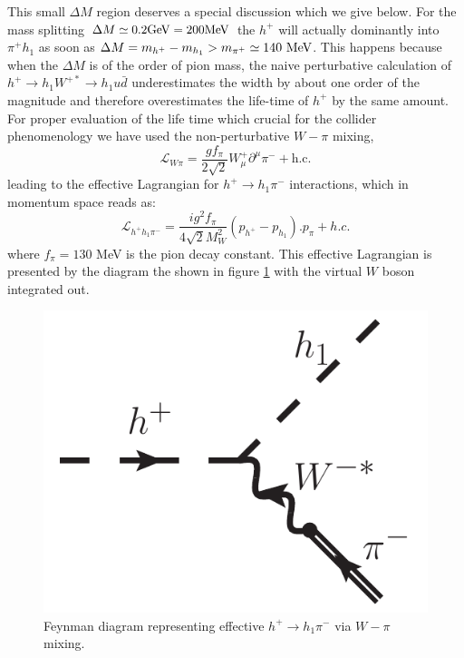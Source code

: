 \documentclass[12pt,a4paper]{article}
\newcommand {\blue} {\color{blue}}
\begin{document}
{\blue This small $\Delta M$ region deserves a special discussion which we give below.
For the mass splitting $\Delta M\simeq 0.2  {\rm GeV} = 200 {\rm MeV}$ the $h^+$ will actually  dominantly into $\pi^+ h_1$
as soon as $\Delta M = m_{h^+}-m_{h_1} > m_{\pi^+} \simeq 140~{\rm MeV}$. This happens because when the $\Delta M$ is of the order of pion mass, the naive perturbative calculation of $h^+ \to h_1 W^{+*} \to  h_1 u\bar{d}$ underestimates the 
width by about one order of the magnitude and therefore overestimates
 the life-time of $h^+$ by the same amount. 
For proper evaluation of the life time which crucial for the collider phenomenology we have used the non-perturbative 
$W-\pi$ mixing, 
\begin{equation}
  \mathcal{L}_{W\pi}  = \frac{g f_{\pi}}{2\sqrt{2}}W_{\mu}^{+}\partial^{\mu}\pi^{-} + 
\mathrm{h.c.}
\label{eq:wpi}
  \end{equation}
leading to the effective Lagrangian for $h^+ \to  h_1 \pi^-$ interactions,
which in momentum space reads as:
  \begin{equation}
\mathcal{L}_{h^+h_1\pi^-}  =  
\frac{i g^2 f_{\pi}}{4\sqrt{2}M_W^2} 
(p_{h^+}-p_{h_1}).p_{\pi} +h.c.
\label{EFT-pion}
\end{equation}
where  $f_{\pi}=130$ MeV is the  pion decay constant. This effective Lagrangian is presented by the  diagram the shown in figure \ref{fig:decay} with the virtual $W$ boson integrated out.
\begin{figure}[htb]
  \centering
  \includegraphics[scale=0.5]{h+h1-pion.pdf}
  \caption{Feynman diagram representing effective 
  $h^+ \to  h_1 \pi^-$ via $W-\pi$ mixing.
  }
  \label{fig:decay}
\end{figure}

}
\end{document}

